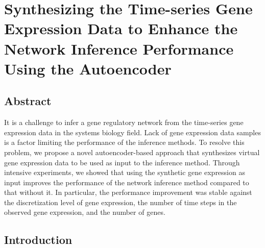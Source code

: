 
\chapter{Synthesizing the Time-series Gene Expression Data to Enhance the Network Inference Performance Using the Autoencoder} %

\label{Chapter4} %




\section{Abstract}
It is a challenge to infer a gene regulatory network from the time-series gene expression data in the systems biology field. Lack of gene expression data samples is a factor limiting the performance of the inference methods. To resolve this problem, we propose a novel autoencoder-based approach that synthesizes virtual gene expression data to be used as input to the inference method. Through intensive experiments, we showed that using the synthetic gene expression as input improves the performance of the network inference method compared to that without it. In particular, the performance improvement was stable against the discretization level of gene expression, the number of time steps in the observed gene expression, and the number of genes.


\section{Introduction}

